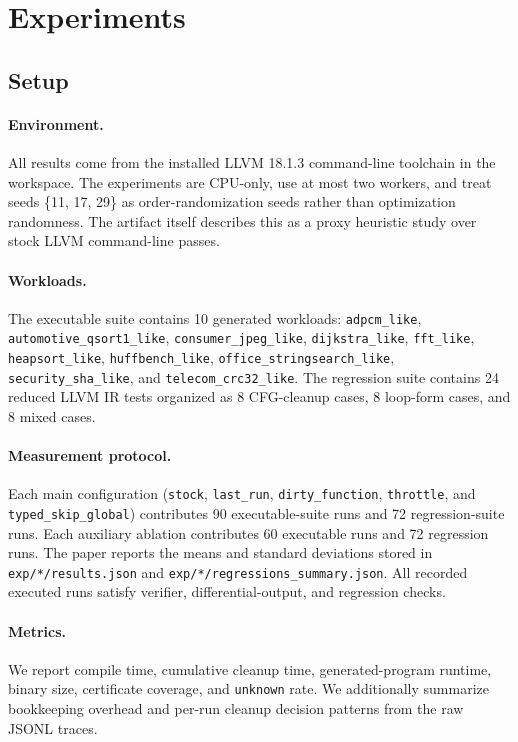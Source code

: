 \documentclass{article}
\begin{document}
\section{Experiments}
\label{sec:experiments}

\subsection{Setup}

\paragraph{Environment.}
All results come from the installed LLVM 18.1.3 command-line toolchain in the workspace. The experiments are CPU-only, use at most two workers, and treat seeds \{11, 17, 29\} as order-randomization seeds rather than optimization randomness. The artifact itself describes this as a proxy heuristic study over stock LLVM command-line passes.

\paragraph{Workloads.}
The executable suite contains 10 generated workloads:
\texttt{adpcm\_like}, \texttt{automotive\_qsort1\_like}, \texttt{consumer\_jpeg\_like}, \texttt{dijkstra\_like}, \texttt{fft\_like}, \texttt{heapsort\_like}, \texttt{huffbench\_like}, \texttt{office\_stringsearch\_like}, \texttt{security\_sha\_like}, and \texttt{telecom\_crc32\_like}. The regression suite contains 24 reduced LLVM IR tests organized as 8 CFG-cleanup cases, 8 loop-form cases, and 8 mixed cases.

\paragraph{Measurement protocol.}
Each main configuration (\texttt{stock}, \texttt{last\_run}, \texttt{dirty\_function}, \texttt{throttle}, and \texttt{typed\_skip\_global}) contributes 90 executable-suite runs and 72 regression-suite runs. Each auxiliary ablation contributes 60 executable runs and 72 regression runs. The paper reports the means and standard deviations stored in \texttt{exp/*/results.json} and \texttt{exp/*/regressions\_summary.json}. All recorded executed runs satisfy verifier, differential-output, and regression checks.

\paragraph{Metrics.}
We report compile time, cumulative cleanup time, generated-program runtime, binary size, certificate coverage, and \texttt{unknown} rate. We additionally summarize bookkeeping overhead and per-run cleanup decision patterns from the raw JSONL traces.
\end{document}
